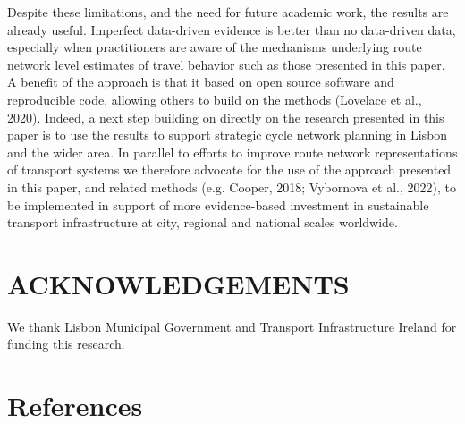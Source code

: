 \documentclass{isprs} %
\begin{document}
Despite these limitations, and the need for future academic work, the results are already useful.
Imperfect data-driven evidence is better than no data-driven data, especially when practitioners are aware of the mechanisms underlying route network level estimates of travel behavior such as those presented in this paper.
A benefit of the approach is that it based on open source software and reproducible code, allowing others to build on the methods (Lovelace et al., 2020).
Indeed, a next step building on directly on the research presented in this paper is to use the results to support strategic cycle network planning in Lisbon and the wider area.
In parallel to efforts to improve route network representations of transport systems we therefore advocate for the use of the approach presented in this paper, and related methods (e.g. Cooper, 2018; Vybornova et al., 2022), to be implemented in support of more evidence-based investment in sustainable transport infrastructure at city, regional and national scales worldwide.

\section*{ACKNOWLEDGEMENTS}\label{ACKNOWLEDGEMENTS}

We thank Lisbon Municipal Government and Transport Infrastructure Ireland for funding this research.

\hypertarget{references}{%
\section*{References}\label{references}}
\end{document}
